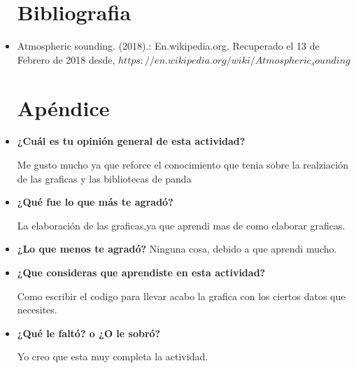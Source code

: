 \documentclass{article}
\begin{document}
\begin{itemize}
\section{Bibliografia}
\item 
Atmospheric sounding. (2018).:
En.wikipedia.org. Recuperado el 13 de Febrero de 2018
desde, $https://en.wikipedia.org/wiki/Atmospheric_sounding$


\section{Apéndice}
\item\textbf{{¿Cuál es tu opinión general de esta actividad?}}

Me gusto mucho ya que reforce el conocimiento que tenia sobre la realziación de las graficas y las bibliotecas de panda 

\item\textbf{{¿Qué fue lo que más te agradó?}}

La elaboración de las graficas,ya que aprendi mas de como elaborar graficas.


\item\textbf{{¿Lo que menos te agradó?}}
Ninguna cosa, debido a que aprendi mucho.


\item\textbf{{¿Que consideras que aprendiste en esta actividad?}}

Como escribir el codigo para llevar acabo la grafica con los ciertos datos que necesites.

\item\textbf{{¿Qué le faltó? o ¿O le sobró?}}

Yo creo que esta muy completa la actividad.




    
 
\end{itemize}
 
  
 
\end{document}
